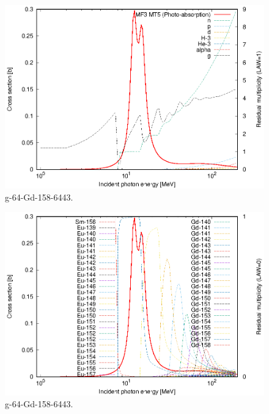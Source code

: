\begin{figure}
 \includegraphics[width=\linewidth]{eps/g_64-Gd-158_6443.eps}
  \caption{g-64-Gd-158-6443.}
\end{figure}
\begin{figure}
 \includegraphics[width=\linewidth]{eps-law0/g_64-Gd-158_6443.eps}
 \caption{g-64-Gd-158-6443.}
\end{figure}
\newpage \clearpage

